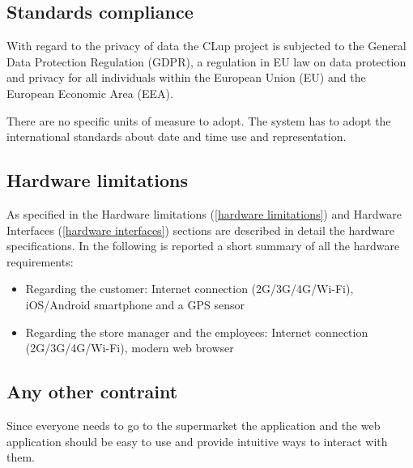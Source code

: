 \subsection{Standards compliance}
With regard to the privacy of data the CLup project is subjected to the General Data Protection Regulation (GDPR), a regulation in EU law on data protection and privacy for all individuals within the European Union (EU) and the European Economic Area (EEA).

There are no specific units of measure to adopt. The system has to adopt the international standards about date and time use and representation.

\subsection{Hardware limitations}
As specified in the Hardware limitations (\ref{hardware limitations}) and Hardware Interfaces (\ref{hardware interfaces}) sections are described in detail the hardware specifications. In the following is reported a short summary of all the hardware requirements:
\begin{itemize}
    \item Regarding the customer: Internet connection (2G/3G/4G/Wi-Fi), iOS/Android smartphone and a GPS sensor
    \item Regarding the store manager and the employees: Internet connection (2G/3G/4G/Wi-Fi), modern web browser
\end{itemize}

\subsection{Any other contraint}
Since everyone needs to go to the supermarket the application and the web application should be easy to use and provide intuitive ways to interact with them.
